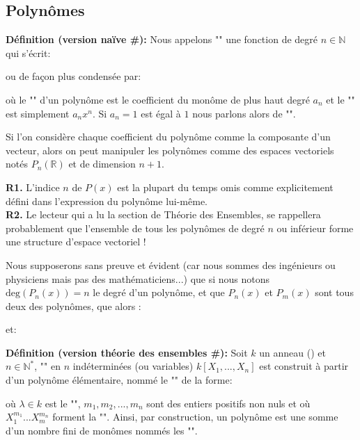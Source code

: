 	\subsection{Polynômes}\label{polynomial}
	\textbf{Définition (version naïve \#\mydef):} Nous appelons "" une fonction de degré $n\in \mathbb{N}$ qui s'écrit:
	
	ou de façon plus condensée par:
	
	où le "" d'un polynôme est le coefficient du monôme de plus haut degré $a_n$ et le "" est simplement $a_nx^n$. Si $a_n=1$ est égal à $1$ nous parlons alors de "".
	 
	 Si l'on considère chaque coefficient du polynôme comme la composante d'un vecteur\label{polynomial vector}, alors on peut manipuler les polynômes comme des espaces vectoriels notés $P_n(\mathbb{R})$ et de dimension $n+1$.
	 
	\begin{tcolorbox}[title=Remarques,colframe=black,arc=10pt]
	\textbf{R1.} L'indice $n$ de $P (x)$ est la plupart du temps omis comme explicitement défini dans l'expression du polynôme lui-même.\\
	
	\textbf{R2.} Le lecteur qui a lu la section de Théorie des Ensembles, se rappellera probablement que l'ensemble de tous les polynômes de degré $n$ ou inférieur forme une structure d'espace vectoriel !
	\end{tcolorbox}
	Nous supposerons sans preuve et évident (car nous sommes des ingénieurs ou physiciens mais pas des mathématiciens...) que si nous notons $\text{deg}(P_n(x))=n$ le degré d'un polynôme, et que $P_n(x) $ et $P_m(x)$ sont tous deux des polynômes, que alors :
	
	et:
	
	
	\textbf{Définition (version théorie des ensembles \#\mydef):} Soit $k$ un anneau () et $n\in \mathbb{N}^{*}$, "\label{polynomial ring}" en $n$ indéterminées (ou variables) $k[X_1,...,X_n]$ est construit à partir d'un polynôme élémentaire, nommé le "" de la forme:
	
	où $\lambda \in k$ est le "", $m_1,m_2,...,m_n$ sont des entiers positifs non nuls et où $X_1 ^{m_1}...X_m^{m_n}$ forment la "". Ainsi, par construction, un polynôme est une somme d'un nombre fini de monômes nommés les "".
	
